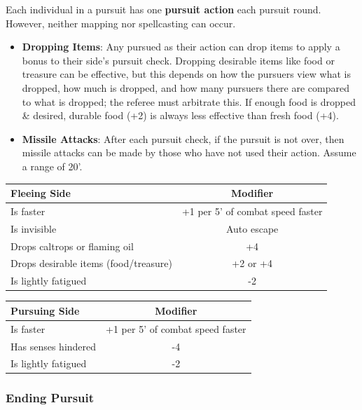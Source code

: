 \documentclass{book}
\providecommand{\tightlist}{%
\setlength{\itemsep}{0pt}\setlength{\parskip}{0pt}}
\begin{document}
Each individual in a pursuit has one \textbf{pursuit action} each
pursuit round. However, neither mapping nor spellcasting can occur.


\begin{itemize}
\tightlist
\item
  \textbf{Dropping Items}: Any pursued as their action can drop items to
  apply a bonus to their side's pursuit check. Dropping desirable items
  like food or treasure can be effective, but this depends on how the
  pursuers view what is dropped, how much is dropped, and how many
  pursuers there are compared to what is dropped; the referee must
  arbitrate this. If enough food is dropped \& desired, durable food
  (+2) is always less effective than fresh food (+4).
\item
  \textbf{Missile Attacks}: After each pursuit check, if the pursuit is
  not over, then missile attacks can be made by those who have not used
  their action. Assume a range of 20'.
\end{itemize}

\begin{table}[ht]
	\centering
	\begin{tabular}{lc}
		\toprule
		Fleeing Side & Modifier \\
		\midrule
		Is faster & +1 per 5' of combat speed faster \\
		Is invisible & Auto escape \\
		Drops caltrops or flaming oil & +4 \\
		Drops desirable items (food/treasure) & +2 or +4 \\
		Is lightly fatigued & -2 \\
		\bottomrule
	\end{tabular}
\end{table}

\begin{table}[ht]
	\centering
	\begin{tabular}{lc}
		\toprule
		Pursuing Side & Modifier \\
		\midrule
		Is faster & +1 per 5' of combat speed faster \\
		Has senses hindered & -4 \\
		Is lightly fatigued & -2 \\	
		\bottomrule
	\end{tabular}
\end{table}



\subsubsection*{Ending Pursuit}\label{ending-pursuit}
\end{document}
